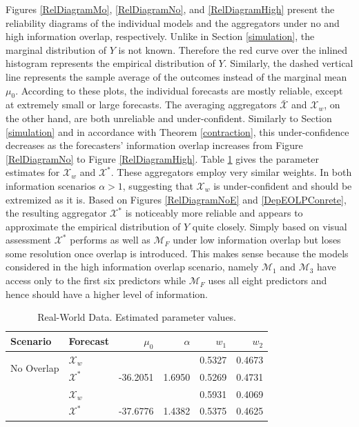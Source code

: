 \documentclass[12pt]{article}
\theoremstyle{definition}
\theoremstyle{definition}
\begin{document}
Figures \ref{RelDiagramMo}, \ref{RelDiagramNo}, and \ref{RelDiagramHigh} present the reliability diagrams of the individual models and the aggregators under no and high information overlap, respectively. Unlike in Section \ref{simulation}, the marginal distribution of $Y$ is not known. Therefore the red curve over the inlined histogram represents the empirical distribution of $Y$. Similarly, the dashed vertical line represents the sample average of the outcomes instead of the marginal mean $\mu_0$. According to these plots, the individual forecasts are mostly reliable, except at extremely small or large forecasts. The averaging aggregators $\bar{\mathcal{X}}$ and $\mathcal{X}_w$, on the other hand, are both unreliable and under-confident. Similarly to Section \ref{simulation} and in accordance with Theorem \ref{contraction}, this under-confidence decreases as the forecasters' information overlap increases from Figure  \ref{RelDiagramNo} to Figure \ref{RelDiagramHigh}.  Table \ref{NoParamsReal} gives the parameter estimates for $\mathcal{X}_w$ and $\mathcal{X}^*$. These aggregators employ very similar weights. In both information scenarios $\alpha > 1$, suggesting that $\mathcal{X}_w$ is under-confident and should be extremized as it is. Based on Figures \ref{RelDiagramNoE} and  \ref{DepEOLPConrete}, the resulting aggregator $\mathcal{X}^*$ is noticeably more reliable and appears to approximate the empirical distribution of $Y$ quite closely. Simply based on visual assessment $\mathcal{X}^*$ performs as well as $\mathcal{M}_F$ under low information overlap but  loses some resolution once  overlap is introduced. This makes sense because the models considered in the high information overlap scenario, namely $\mathcal{M}_1$ and $\mathcal{M}_3$ have access only to the first six predictors while $\mathcal{M}_F$ uses all eight predictors and hence should have a higher level of information. 



\begin{table}[t!]
\centering
\caption{Real-World Data. Estimated parameter values.} 
\begin{tabular}{llrrrr}
   \hline \hline
Scenario & Forecast & $\mu_0$ & $\alpha$ & $w_1$ & $w_2$\\
  \hline
\multirow{2}{*}{No Overlap} & $\mathcal{X}_w$ &  &  & 0.5327 & 0.4673 \\ 
&  $\mathcal{X}^*$ & -36.2051 & 1.6950 & 0.5269 & 0.4731 \\  \rule{0pt}{2.9ex} 
\hspace{-0.2em}\multirow{2}{*}{High Overlap}  & $\mathcal{X}_w$ &  &  & 0.5931 & 0.4069 \\ 
 & $\mathcal{X}^*$ & -37.6776 & 1.4382 & 0.5375 & 0.4625 \\ 
   \hline
\end{tabular}
\label{NoParamsReal}
\end{table}
\end{document}
